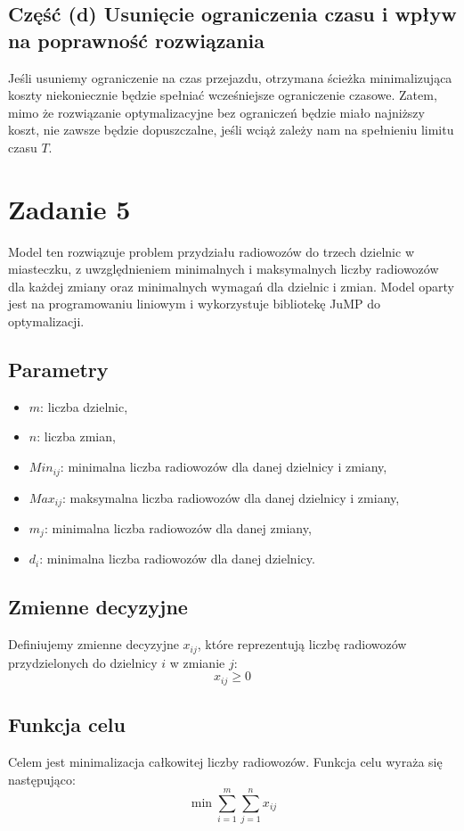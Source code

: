 \documentclass[12pt, letterpaper]{article}
\begin{document}
\subsection{Część (d) Usunięcie ograniczenia czasu i wpływ na poprawność
  rozwiązania}
Jeśli usuniemy ograniczenie na czas przejazdu, otrzymana ścieżka minimalizująca
koszty niekoniecznie będzie spełniać wcześniejsze ograniczenie czasowe. Zatem,
mimo że rozwiązanie optymalizacyjne bez ograniczeń będzie miało najniższy
koszt, nie zawsze będzie dopuszczalne, jeśli wciąż zależy nam na spełnieniu
limitu czasu \( T \).

\section{Zadanie 5}

Model ten rozwiązuje problem przydziału radiowozów do trzech dzielnic w
miasteczku, z uwzględnieniem minimalnych i maksymalnych liczby radiowozów dla
każdej zmiany oraz minimalnych wymagań dla dzielnic i zmian. Model oparty jest
na programowaniu liniowym i wykorzystuje bibliotekę JuMP do optymalizacji.

\subsection{Parametry}
\begin{itemize}
  \item \( m \): liczba dzielnic,
  \item \( n \): liczba zmian,
  \item \( Min_{ij} \): minimalna liczba radiowozów dla danej dzielnicy i
        zmiany,
  \item \( Max_{ij} \): maksymalna liczba radiowozów dla danej dzielnicy i
        zmiany,
  \item \( m_j \): minimalna liczba radiowozów dla danej zmiany,
  \item \( d_i \): minimalna liczba radiowozów dla danej dzielnicy.
\end{itemize}

\subsection{Zmienne decyzyjne}
Definiujemy zmienne decyzyjne \( x_{ij} \), które reprezentują liczbę
radiowozów przydzielonych do dzielnicy \( i \) w zmianie \( j \):
\[
  x_{ij} \geq 0
\]

\subsection{Funkcja celu}
Celem jest minimalizacja całkowitej liczby radiowozów. Funkcja celu wyraża się
następująco:
\[
  \min \sum_{i=1}^{m} \sum_{j=1}^{n} x_{ij}
\]
\end{document}
